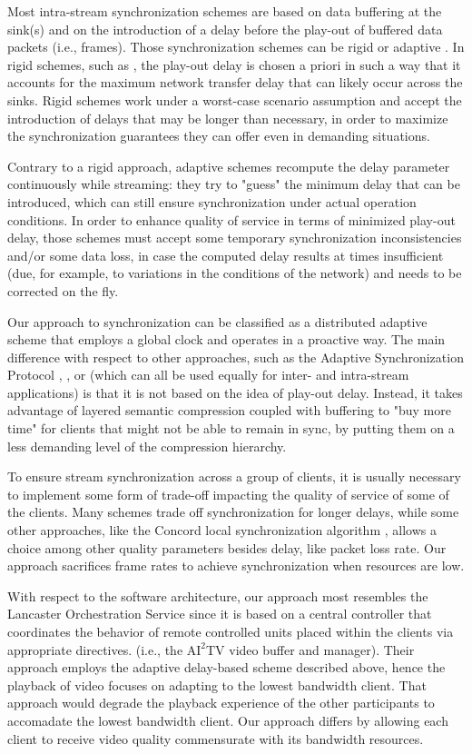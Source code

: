 \documentclass{sig-alternate}
\begin{document}
Most intra-stream synchronization schemes are based on data buffering
at the sink(s) and on the introduction of a delay before the play-out
of buffered data packets (i.e., frames).  Those synchronization
schemes can be rigid or adaptive \cite{Clark92}.  In rigid schemes,
such as \cite{Ferrari}, the play-out delay is chosen a priori in such
a way that it accounts for the maximum network transfer delay that can
likely occur across the sinks.  Rigid schemes work under a worst-case
scenario assumption and accept the introduction of delays that may be
longer than necessary, in order to maximize the synchronization
guarantees they can offer even in demanding situations.  

Contrary to a rigid approach, adaptive schemes \cite{ASP,Lancaster,FSP} 
recompute the delay parameter continuously while streaming: they
try to "guess" the minimum delay that can be introduced, which can
still ensure synchronization under actual operation conditions.  In
order to enhance quality of service in terms of minimized play-out
delay, those schemes must accept some temporary synchronization
inconsistencies and/or some data loss, in case the computed delay
results at times insufficient (due, for example, to variations in the
conditions of the network) and needs to be corrected on the fly.

Our approach to synchronization can be classified as a distributed
adaptive scheme that employs a global clock and operates in a
proactive way.  The main difference with respect to other approaches,
such as the Adaptive Synchronization Protocol \cite{ASP},
\cite{GONZALEZ}, or \cite{LIU} (which can all be used equally for
inter- and intra-stream applications) is that it is not based on the
idea of play-out delay.  Instead, it takes advantage of layered
semantic compression coupled with buffering to "buy more time" for
clients that might not be able to remain in sync, by putting them on a
less demanding level of the compression hierarchy.

To ensure stream synchronization across a group of clients, it is
usually necessary to implement some form of trade-off impacting the
quality of service of some of the clients.  Many schemes trade off
synchronization for longer delays, while some other approaches, like
the Concord local synchronization algorithm \cite{Concord}, allows a
choice among other quality parameters besides delay, like packet loss
rate.  Our approach sacrifices frame rates to achieve synchronization
when resources are low.

With respect to the software architecture, our approach most resembles
the Lancaster Orchestration Service \cite{Lancaster} since it is based
on a central controller that coordinates the behavior of remote
controlled units placed within the clients via appropriate directives.
(i.e., the $\mathrm{AI}^2$TV video buffer and manager).  Their
approach employs the adaptive delay-based scheme described above,
hence the playback of video focuses on adapting to the lowest
bandwidth client.  That approach would degrade the playback experience
of the other participants to accomadate the lowest bandwidth client.
Our approach differs by allowing each client to receive video quality
commensurate with its bandwidth resources.
\end{document}
